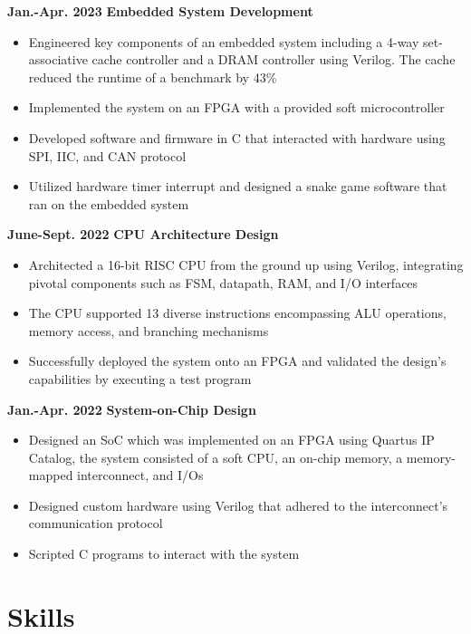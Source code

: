 \documentclass[11pt,a4paper,sans]{moderncv}
\begin{document}
\cventry
{\textnormal{\textbf{Jan.-Apr. 2023}}}
{\textnormal{\textbf{Embedded System Development}}}
{}{}{}
{
    \begin{itemize}
    \item Engineered key components of an embedded system including a 4-way set-associative cache controller and a DRAM controller using Verilog. The cache reduced the runtime of a benchmark by 43\%
    \item Implemented the system on an FPGA with a provided soft microcontroller 
    \item Developed software and firmware in C that interacted with hardware using SPI, IIC, and CAN protocol 
    \item Utilized hardware timer interrupt and designed a snake game software that ran on the embedded system
    \end{itemize}
}

\cventry
{\textnormal{\textbf{June-Sept. 2022}}}
{\textnormal{\textbf{CPU Architecture Design}}}
{}{}{}
{
    \begin{itemize}
    \item Architected a 16-bit RISC CPU from the ground up using Verilog, integrating pivotal components such as FSM, datapath, RAM, and I/O interfaces
    \item The CPU supported 13 diverse instructions encompassing ALU operations, memory access, and branching mechanisms
    \item Successfully deployed the system onto an FPGA and validated the design's capabilities by executing a test program
\end{itemize}
}

\cventry
{\textnormal{\textbf{Jan.-Apr. 2022}}}
{\textnormal{\textbf{System-on-Chip Design}}}
{}{}{}
{
    \begin{itemize}
    \item Designed an SoC which was implemented on an FPGA using Quartus IP Catalog, the system consisted of a soft CPU, an on-chip memory, a memory-mapped interconnect, and I/Os
    \item Designed custom hardware using Verilog that adhered to the interconnect's communication protocol 
    \item Scripted C programs to interact with the system
    \end{itemize}
}

\section{Skills}

\end{document}
